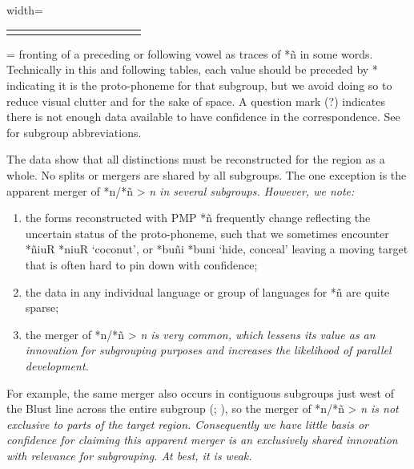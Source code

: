 \begin{table}
\begin{adjustbox}{width=\textwidth}
\begin{threeparttable}
\begin{tabular}{llll|lll|ll|lll}
		\lspbottomrule
	\end{tabular}
		\begin{tablenotes}\tnsize
			\item[†] { = fronting of a preceding or following vowel as traces
						of *ñ in some words.
						Technically in this and following tables, each value should be
						preceded by * indicating it is the proto-phoneme for that subgroup,
						but we avoid doing so to reduce visual clutter
						and for the sake of space.
						A question mark (?) indicates there is not enough data available
						to have confidence in the correspondence.
						See  for subgroup abbreviations.}
		\end{tablenotes}
	\end{threeparttable}
\end{adjustbox}
\end{table}

The data show that all distinctions must be reconstructed for
the region as a whole.
No splits or mergers are shared by all subgroups.
The one exception is the apparent merger of *n/*ñ > \it{n} in several subgroups.
However, we note:

\begin{enumerate}
	\item the forms reconstructed with PMP *ñ frequently
				change reflecting the uncertain status of the proto-phoneme,
				such that we sometimes encounter *ñiuR {\tl} *niuR ‘coconut’,
				or *buñi {\tl} *buni ‘hide,
				conceal’ leaving a moving target that is often hard to pin
				down with confidence;
	\item the data in any individual language
				or group of languages for *ñ are quite sparse;
	\item the merger
				of *n/*ñ > \it{n} is very common,
				which lessens its value as an innovation for subgrouping purposes
				and increases the likelihood of parallel development.
\end{enumerate}

For example, the same merger also occurs in contiguous subgroups
just west of the Blust line across the entire  subgroup
(\citealp[55ff]{Mead1998}; \citealp{Mead1999}),
so the merger of *n/*ñ > \it{n} is not exclusive to parts
of the target region.
Consequently we have little basis or confidence for claiming
this apparent merger is an exclusively shared
innovation with relevance for subgrouping.
At best, it is weak.

